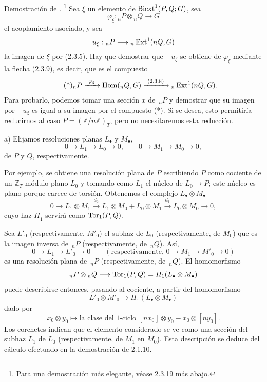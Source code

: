 \par\medskip
\noindent\underline{Demostración de .}
\footnote{Para una demostración más elegante, véase 2.3.19 más abajo.}
Sea $\xi$ un elemento de $\operatorname{Biext}^1(P,Q;G)$, sea
\[
 \varphi_\xi:{}_nP\otimes{}_nQ\longrightarrow G
\]
el acoplamiento asociado, y sea
\[
 u_\xi:{}_nP\longrightarrow{}_n\operatorname{Ext}^1(nQ,G)
\]
la imagen de $\xi$ por (2.3.5). Hay que demostrar que $-u_\xi$ se
obtiene de $\varphi_\xi$ mediante la flecha (2.3.9), es decir, que es
el compuesto
\begin{equation}\tag{*}
 {}_nP
 \xrightarrow{\ \varphi_\xi\ }
 \operatorname{Hom}({}_nQ,G)
 \xrightarrow{\ (2.3.8)\ }
 {}_n\operatorname{Ext}^1(nQ,G).
\end{equation}
Para probarlo, podemos tomar una sección $x$ de $\,{}_nP$ y demostrar
que su imagen por $-u_\xi$ es igual a su imagen por el compuesto (*).
Si se desea, esto permitiría reducirnos al caso
$P=(\mathbb Z/n\mathbb Z)_T$, pero no necesitaremos esta reducción.

\medskip
\noindent a) Elijamos resoluciones planas $L_\bullet$ y $M_\bullet$,
\[
 0\longrightarrow L_1\longrightarrow L_0\longrightarrow0,
 \qquad
 0\longrightarrow M_1\longrightarrow M_0\longrightarrow0,
\]
de $P$ y $Q$, respectivamente.


Por ejemplo, se obtiene una resolución plana de $P$ escribiendo $P$
como cociente de un $\mathbb Z_T$-módulo plano $L_0$ y tomando como
$L_1$ el núcleo de $L_0\longrightarrow P$; este núcleo es plano
porque carece de torsión. Obtenemos el complejo
$L_\bullet\otimes M_\bullet$
\[
 0\longrightarrow L_1\otimes M_1
 \xrightarrow{d_2}
 L_1\otimes M_0+L_0\otimes M_1
 \xrightarrow{d_1}
 L_0\otimes M_0
 \longrightarrow0,
\]
cuyo haz $\underline H_1$ servirá como $\operatorname{Tor}_1(P,Q)$.

Sea $L'_0$ (respectivamente, $M'_0$) el subhaz de $L_0$
(respectivamente, de $M_0$) que es la imagen inversa de $\,{}_nP$
(respectivamente, de $\,{}_nQ$). Así,
\[
 0\longrightarrow L_1\longrightarrow L'_0\longrightarrow0
 \qquad
 \left(\text{respectivamente, }
 0\longrightarrow M_1\longrightarrow M'_0\longrightarrow0\right)
\]
es una resolución plana de $\,{}_nP$ (respectivamente, de
$\,{}_nQ$). El homomorfismo
\[
 {}_nP\otimes{}_nQ
 \longrightarrow
 \operatorname{Tor}_1(P,Q)=H_1(L_\bullet\otimes M_\bullet)
\]
puede describirse entonces, pasando al cociente, a partir del
homomorfismo
\[
 L'_0\otimes M'_0
 \longrightarrow
 \underline H_1(L_\bullet\otimes M_\bullet)
\]
dado por
\[
 x_0\otimes y_0
 \longmapsto
 \text{la clase del $1$-ciclo }
 [nx_0]\otimes y_0-x_0\otimes[ny_0].
\]
Los corchetes indican que el elemento considerado se ve como una
sección del subhaz $L_1$ de $L_0$ (respectivamente, de $M_1$ en
$M_0$). Esta descripción se deduce del cálculo efectuado en la
demostración de 2.1.10.

